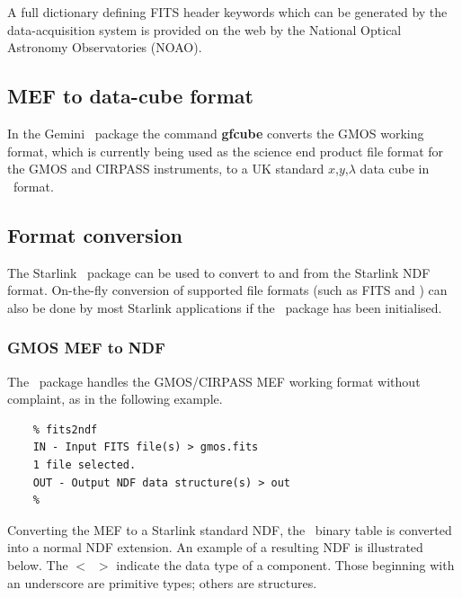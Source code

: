 \documentclass[twoside,11pt]{article}
\newcommand{\htmladdnormallink}[2]{#1}
\newcommand{\xref}[3]{#1}
\newcommand{\xlabel}[1]{}
\begin{document}
\begin{\htmlonly}
A full
\htmladdnormallink{dictionary}{http://iraf.noao.edu/projects/ccdmosaic/imagedef/fitsdic.html}
defining FITS header keywords which can be generated by the
data-acquisition system is provided on the web by the National Optical
Astronomy Observatories (NOAO).
 
\subsection{\xlabel{sc16_mef2cub}MEF to data-cube format\label{sc16_mef2cub}}

In the Gemini \IRAF\ package the command {\bf gfcube} converts the
GMOS working format, which is currently being used as the science end
product file format for the GMOS and CIRPASS instruments, to a UK
standard $x$,$y$,$\lambda$ data cube in \FITSref\ format.

\subsection{\xlabel{sc16_converting}Format conversion\label{sc16_converting}}

The Starlink \CONVERTref\ package  can be used
to convert to and from the Starlink \xref{NDF}{sun33}{} format.
On-the-fly conversion of supported file formats (such as FITS and
\IRAF) can also be done by most Starlink applications if the \CONVERT\
package has been initialised.

\subsubsection{GMOS MEF to NDF}

The \CONVERTref\ package handles the GMOS/CIRPASS MEF
working format without complaint, as in the following example.

\begin{verbatim}
    % fits2ndf
    IN - Input FITS file(s) > gmos.fits
    1 file selected.
    OUT - Output NDF data structure(s) > out
    %
\end{verbatim}

Converting the MEF to a Starlink standard \xref{NDF}{sun33}{}, the
\FITSref\ binary table is converted into a normal NDF extension.  An
example of a resulting NDF is illustrated below.  The $<$~$>$ indicate
the data type of a component.  Those beginning with an underscore are
primitive types; others are structures.


\end{\htmlonly}
\end{document}
